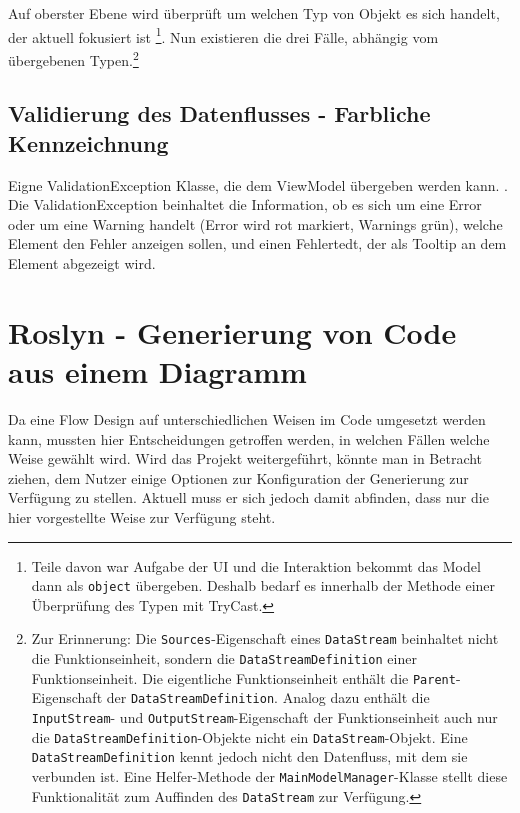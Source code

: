 \begin{enumerate}
	Auf oberster Ebene wird überprüft um welchen Typ von Objekt es sich
	handelt, der aktuell fokusiert ist \footnote{Teile davon war Aufgabe der UI und die
	Interaktion bekommt das Model dann als \texttt{object} übergeben. Deshalb bedarf es
	innerhalb der Methode einer Überprüfung des Typen mit TryCast.}. Nun existieren die drei Fälle, abhängig vom übergebenen Typen.\footnote{Zur Erinnerung: Die \texttt{Sources}-Eigenschaft eines \texttt{DataStream} beinhaltet nicht die Funktionseinheit,
	sondern die \texttt{DataStreamDefinition} einer Funktionseinheit. Die eigentliche
	Funktionseinheit enthält die \texttt{Parent}-Eigenschaft der \texttt{DataStreamDefinition}.
	Analog dazu enthält die \texttt{InputStream}- und \texttt{OutputStream}-Eigenschaft der
	Funktionseinheit auch nur die \texttt{DataStreamDefinition}-Objekte nicht ein \texttt{DataStream}-Objekt.
	Eine \texttt{DataStreamDefinition} kennt jedoch nicht den Datenfluss, mit dem sie
	verbunden ist. Eine Helfer-Methode der \texttt{MainModelManager}-Klasse stellt
	diese Funktionalität zum Auffinden des \texttt{DataStream} zur Verfügung.}
\end{enumerate}

\subsection{Validierung des Datenflusses - Farbliche Kennzeichnung }

Eigne ValidationException Klasse, die dem ViewModel übergeben werden kann. .
Die ValidationException beinhaltet die Information, ob es sich um eine Error oder um eine Warning handelt (Error wird rot markiert, Warnings grün), welche  Element den Fehler anzeigen sollen, und einen Fehlertedt, der als Tooltip an dem Element abgezeigt wird.





\section{Roslyn - Generierung von Code aus einem Diagramm}

Da eine Flow Design auf unterschiedlichen Weisen im Code umgesetzt werden
kann, mussten hier Entscheidungen getroffen werden, in welchen Fällen
welche Weise gewählt wird. Wird das Projekt weitergeführt, könnte man in
Betracht ziehen, dem Nutzer einige Optionen zur Konfiguration der Generierung
zur Verfügung zu stellen. Aktuell muss er sich jedoch damit abfinden, dass nur die hier vorgestellte Weise zur Verfügung steht.


